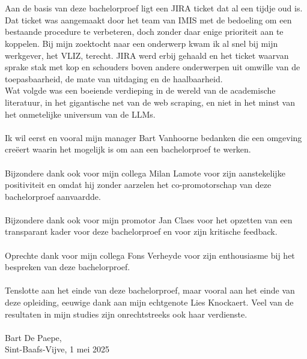 
\chapter*{}%
\label{ch:voorwoord}


Aan de basis van deze bachelorproef ligt een JIRA ticket dat al een tijdje oud is. Dat ticket was aangemaakt door het team van IMIS met de bedoeling om een bestaande procedure te verbeteren, doch zonder daar enige prioriteit aan te koppelen. Bij mijn zoektocht naar een onderwerp kwam ik al snel bij mijn werkgever, het VLIZ, terecht. JIRA werd erbij gehaald en het ticket waarvan sprake stak met kop en schouders boven andere onderwerpen uit omwille van de toepasbaarheid, de mate van uitdaging en de haalbaarheid.\\
Wat volgde was een boeiende verdieping in de wereld van de academische literatuur, in het gigantische net van de web scraping, en niet in het minst van het onmetelijke universum van de LLMs.\\\\
Ik wil eerst en vooral mijn manager Bart Vanhoorne bedanken die een omgeving creëert waarin het mogelijk is om aan een bachelorproef te werken.\\\\
Bijzondere dank ook voor mijn collega Milan Lamote voor zijn aanstekelijke positiviteit en omdat hij zonder aarzelen het co-promotorschap van deze bachelorproef aanvaardde.\\\\
Bijzondere dank ook voor mijn promotor Jan Claes voor het opzetten van een transparant kader voor deze bachelorproef en voor zijn kritische feedback.\\\\
Oprechte dank voor mijn collega Fons Verheyde voor zijn enthousiasme bij het bespreken van deze bachelorproef.\\\\
Tenslotte aan het einde van deze bachelorproef, maar vooral aan het einde van deze opleiding, eeuwige dank aan mijn echtgenote Lies Knockaert. Veel van de resultaten in mijn studies zijn onrechtstreeks ook haar verdienste.
\\\\
Bart De Paepe,\\
Sint-Baafs-Vijve, 1 mei 2025